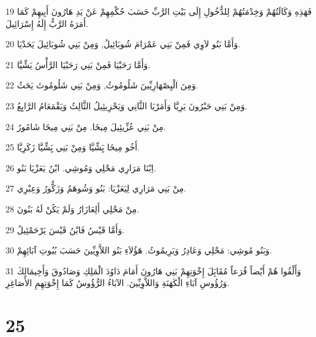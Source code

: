 \par 19 فَهَذِهِ وَكَالَتُهُمْ وَخِدْمَتُهُمْ لِلدُّخُولِ إِلَى بَيْتِ الرَّبِّ حَسَبَ حُكْمِهِمْ عَنْ يَدِ هَارُونَ أَبِيهِمْ كَمَا أَمَرَهُ الرَّبُّ إِلَهُ إِسْرَائِيلَ.
\par 20 وَأَمَّا بَنُو لاَوِي فَمِنْ بَنِي عَمْرَامَ شُوبَائِيلُ, وَمِنْ بَنِي شُوبَائِيلَ يَحَدْيَا.
\par 21 وَأَمَّا رَحَبْيَا فَمِنْ بَنِي رَحَبْيَا الرَّأْسُ يَشِّيَّا.
\par 22 وَمِنَ الْيِصْهَارِيِّينَ شَلُومُوثُ, وَمِنْ بَنِي شَلُومُوثَ يَحَثُ.
\par 23 وَمِنْ بَنِي حَبْرُونَ يَرِيَّا وَأَمَرْيَا الثَّانِي وَيَحْزِيئِيلُ الثَّالِثُ وَيَقْمَعَامُ الرَّابِعُ.
\par 24 مِنْ بَنِي عُزِّيئِيلَ مِيخَا. مِنْ بَنِي مِيخَا شَامُورُ.
\par 25 أَخُو مِيخَا يَِشِّيَّا وَمِنْ بَنِي يَِشِّيَّا زَكَرِيَّا.
\par 26 اِبْنَا مَرَارِي مَحْلِي وَمُوشِي. ابْنُ يَعَزْيَا بَنُو.
\par 27 مِنْ بَنِي مَرَارِي لِيَعَزْيَا: بَنُو وَشُوهَمُ وَزَكُّورُ وَعِبْرِي.
\par 28 مِنْ مَحْلِي أَلِعَازَارُ وَلَمْ يَكُنْ لَهُ بَنُونَ.
\par 29 وَأَمَّا قَيْسُ فَابْنُ قَيْسَ يَرْحَمْئِيلُ.
\par 30 وَبَنُو مُوشِي: مَحْلِي وَعَادِرُ وَيَرِيمُوثُ. هَؤُلاَءِ بَنُو اللاَّوِيِّينَ حَسَبَ بُيُوتِ آبَائِهِمْ.
\par 31 وَأَلْقُوا هُمْ أَيْضاً قُرَعاً مُقَابَِلَ إِخْوَتِهِمْ بَنِي هَارُونَ أَمَامَ دَاوُدَ الْمَلِكِ وَصَادُوقَ وَأَخِيمَالِكَ وَرُؤُوسِ آبَاءِ الْكَهَنَةِ وَاللاَّوِيِّينَ. الآبَاءُ الرُّؤُوسُ كَمَا إِخْوَتِهِمِ الأَصَاغِرِ.

\chapter{25}

